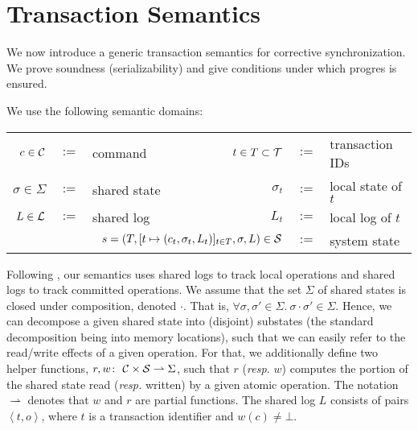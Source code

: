 \section{Transaction Semantics}
\label{sec:concretesemantics}

We now introduce a generic transaction semantics for corrective synchronization. We prove soundness (serializability) and give conditions under which progres is ensured.


%
We use the following semantic domains:
\begin{center}
\footnotesize
\begin{tabular}{rclrrl}
	$c \in {\cal C}$ & $:=$ & command & $t \in T \subset {\cal T}$ & $:=$ & transaction IDs \\
	$\sigma \in \Sigma$ & $:=$ & shared state $\;\;\;\;\;\;\;\;\;\;\;\;\;\;\;\;\;\;\;\;\;\;\;\;\;$ & ${\sigma_t}$ & $:=$ & local state of $t$ \\
	$L \in {\cal L}$ & $:=$ & shared log &
	$L_t$ & $:=$ & local log of $t$ \\
	\multicolumn{4}{r}{
		$s = (T, [t \mapsto (c_t,\sigma_t,L_t)]_{t \in T}, \sigma, L) \in {\cal S}$} & $:=$ & system state \\
\end{tabular}
\end{center}
\normalsize
Following \cite{KoskinenP15}, our semantics uses shared logs to
track local operations and shared logs to track committed operations.
We assume that the set $\Sigma$ of shared states is closed under composition, denoted $\cdot$. That is,
$\forall \sigma,\sigma' \in \Sigma.\ \sigma \cdot \sigma' \in \Sigma$. Hence, we can decompose a given shared state into (disjoint) substates (the standard decomposition being into memory locations), such that we can easily refer to the read/write effects of a given operation.
For that, we additionally define two helper functions,
$r,w \colon\ {\cal C} \times {\cal S} \rightharpoonup \Sigma$, such that $r$ (\textit{resp.} $w$) computes the portion of the shared state read (\textit{resp.} written) by a given atomic operation.
The notation $\rightharpoonup$ denotes that $w$ and $r$ are partial functions. The shared log $L$ consists of pairs $\left\langle t,o \right\rangle$, where $t$ is a transaction identifier and $w(c) \neq \bot$.



